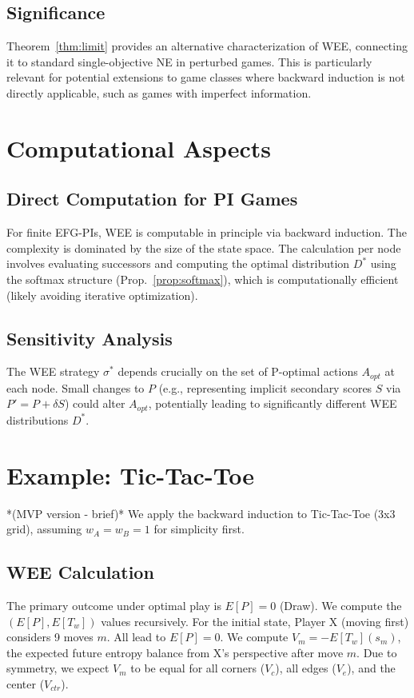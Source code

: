 \documentclass{article}
\begin{document}
\subsection{Significance}
Theorem~\ref{thm:limit} provides an alternative characterization of WEE, connecting it to standard single-objective NE in perturbed games. This is particularly relevant for potential extensions to game classes where backward induction is not directly applicable, such as games with imperfect information.

\section{Computational Aspects}

\subsection{Direct Computation for PI Games}
For finite EFG-PIs, WEE is computable in principle via backward induction. The complexity is dominated by the size of the state space. The calculation per node involves evaluating successors and computing the optimal distribution $D^*$ using the softmax structure (Prop.~\ref{prop:softmax}), which is computationally efficient (likely avoiding iterative optimization).

\subsection{Sensitivity Analysis}
The WEE strategy $\sigma^*$ depends crucially on the set of P-optimal actions $A_{opt}$ at each node. Small changes to $P$ (e.g., representing implicit secondary scores $S$ via $P' = P + \delta S$) could alter $A_{opt}$, potentially leading to significantly different WEE distributions $D^*$.

\section{Example: Tic-Tac-Toe}

*(MVP version - brief)*
We apply the backward induction to Tic-Tac-Toe (3x3 grid), assuming $w_A = w_B = 1$ for simplicity first.

\subsection{WEE Calculation}
The primary outcome under optimal play is $E[P]=0$ (Draw). We compute the $(E[P], E[T_w])$ values recursively. For the initial state, Player X (moving first) considers 9 moves $m$. All lead to $E[P]=0$. We compute $V_m = -E[T_w](s_m)$, the expected future entropy balance from X's perspective after move $m$. Due to symmetry, we expect $V_m$ to be equal for all corners ($V_c$), all edges ($V_e$), and the center ($V_{ctr}$).
\end{document}
